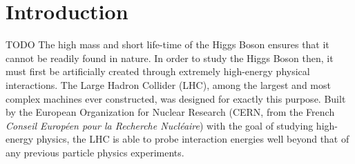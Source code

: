 %
%
%
%

\section{Introduction} TODO
    The high mass and short life-time of the Higgs Boson ensures that it cannot be readily found in nature.
    In order to study the Higgs Boson then, it must first be artificially created through extremely high-energy physical interactions.
    The Large Hadron Collider (LHC), among the largest and most complex machines ever constructed, was designed for exactly this purpose.
    Built by the European Organization for Nuclear Research (CERN, from the French \textit{Conseil Européen pour la Recherche Nucléaire}) with the goal of studying high-energy physics,
    the LHC is able to probe interaction energies well beyond that of any previous particle physics experiments.

